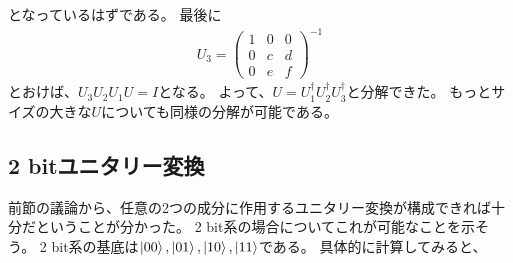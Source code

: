 \documentclass[]{ltjsarticle}
\begin{document}
となっているはずである。
最後に
\begin{align}
    U_3 =
    \begin{pmatrix}
        1 & 0 & 0 \\
        0 & c & d \\
        0 & e & f 
    \end{pmatrix}^{-1}   
\end{align}
とおけば、$U_3U_2U_1U=I$となる。
よって、$U = U_1^\dagger U_2^\dagger U_3^\dagger$と分解できた。
もっとサイズの大きな$U$についても同様の分解が可能である。



\subsection{2 bitユニタリー変換}
前節の議論から、任意の2つの成分に作用するユニタリー変換が構成できれば十分だということが分かった。
2 bit系の場合についてこれが可能なことを示そう。
2 bit系の基底は$\ket{00}, \ket{01}, \ket{10}, \ket{11}$である。
具体的に計算してみると、
\end{document}
